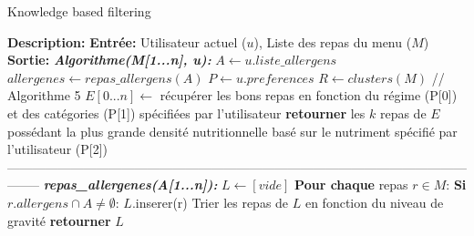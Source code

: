 \documentclass[11pt]{article}
\begin{document}
\begin{algorithm}
    \caption{Knowledge based filtering}
    \begin{algorithmic}[1]
        \Statex \textbf{Description:}
        \Statex \textbf{Entrée:} Utilisateur actuel ($u$), Liste des repas du menu ($M$)
        \Statex \textbf{Sortie:} 
        \State \textbf{\textit{Algorithme(M[1...n], u):}}
        \State \hspace{0.5cm} $A \leftarrow u.liste\_allergens$
        \State \hspace{0.5cm} $allergenes \leftarrow repas\_allergens(A)$
        \State \hspace{0.5cm} $P \leftarrow u.preferences$
        \State \hspace{0.5cm} $R \leftarrow clusters(M)$ // Algorithme 5
        \State \hspace{0.5cm} $E[0...n] \leftarrow$ récupérer les bons repas en fonction du régime (P[0]) et des
        \State \hspace{0.5cm} catégories (P[1]) spécifiées par l'utilisateur
        \State \hspace{0.5cm} \textbf{retourner} les $k$ repas de $E$ possédant la plus grande densité nutritionnelle basé sur
        \State \hspace{0.5cm} le nutriment spécifié par l'utilisateur (P[2])\\
--------------------------------------------------------------------------------------------------------------------
        \State \textbf{\textit{repas\_allergenes(A[1...n]):}}
        \State \hspace{0.5cm} $L \leftarrow [vide]$
        \State \hspace{0.5cm} \textbf{Pour chaque} repas $r\in M$:
        \State \hspace{1cm} \textbf{Si} $r.allergens \cap A \neq \emptyset$:
        \State \hspace{1.5cm} $L$.inserer(r)
        \State \hspace{0.5cm} Trier les repas de $L$ en fonction du niveau de gravité
        \State \hspace{0.5cm} \textbf{retourner} $L$
    \end{algorithmic}
\end{algorithm}
\end{document}
